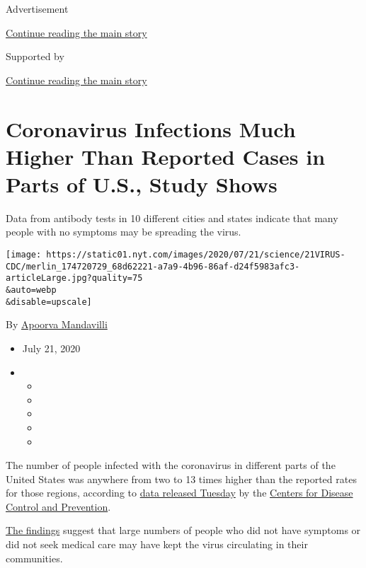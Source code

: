 Advertisement

\protect\hyperlink{after-top}{Continue reading the main story}

Supported by

\protect\hyperlink{after-sponsor}{Continue reading the main story}

\hypertarget{coronavirus-infections-much-higher-than-reported-cases-in-parts-of-us-study-shows}{%
\section{Coronavirus Infections Much Higher Than Reported Cases in Parts
of U.S., Study
Shows}\label{coronavirus-infections-much-higher-than-reported-cases-in-parts-of-us-study-shows}}

Data from antibody tests in 10 different cities and states indicate that
many people with no symptoms may be spreading the virus.

\texttt{[image: https://static01.nyt.com/images/2020/07/21/science/21VIRUS-CDC/merlin\_174720729\_68d62221-a7a9-4b96-86af-d24f5983afc3-articleLarge.jpg?quality=75\\\&auto=webp\\\&disable=upscale]}

By \href{https://www.nytimes.com/by/apoorva-mandavilli}{Apoorva
Mandavilli}

\begin{itemize}
\item
  July 21, 2020
\item
  \begin{itemize}
  \item
  \item
  \item
  \item
  \item
  \end{itemize}
\end{itemize}

The number of people infected with the coronavirus in different parts of
the United States was anywhere from two to 13 times higher than the
reported rates for those regions, according to
\href{https://www.cdc.gov/coronavirus/2019-ncov/cases-updates/commercial-lab-surveys.html}{data
released Tuesday} by the
\href{https://www.nytimes.com/2020/07/24/health/cdc-schools-coronavirus.html}{Centers
for Disease Control and Prevention}.

\href{https://www.cdc.gov/coronavirus/2019-ncov/cases-updates/commercial-lab-surveys.html}{The
findings} suggest that large numbers of people who did not have symptoms
or did not seek medical care may have kept the virus circulating in
their communities.

